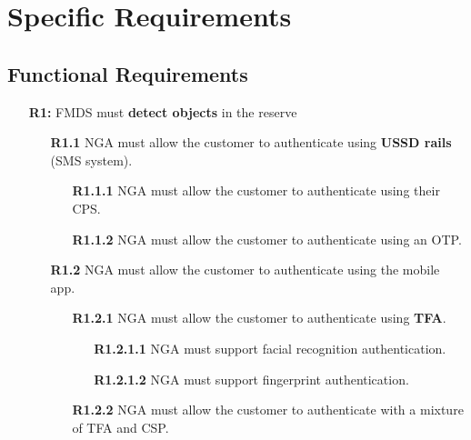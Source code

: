 \chapter{Specific Requirements}

\section{Functional Requirements}

\begin{itemize}
    \item  [\textbf{R1:}] FMDS must \textbf{detect objects} in the reserve
    
    \begin{itemize}
            \item  [\textbf{R1.1}] NGA must allow the customer to authenticate using \textbf{USSD rails} (SMS system).
                \begin{itemize}
                        \item  [\textbf{R1.1.1}] NGA must allow the customer to authenticate using their CPS.
                        \item  [\textbf{R1.1.2}] NGA must allow the customer to authenticate using an OTP.   
                \end{itemize}
            \item  [\textbf{R1.2}] NGA must allow the customer to authenticate using the mobile app.
        \begin{itemize}
            \item  [\textbf{R1.2.1}] NGA must allow the customer to authenticate using \textbf{TFA}.
                \begin{itemize}
                    \item  [\textbf{R1.2.1.1}] NGA must support facial recognition authentication.
                    \item  [\textbf{R1.2.1.2}] NGA must support fingerprint authentication.
                \end{itemize}
            \item  [\textbf{R1.2.2}] NGA must allow the customer to authenticate with a mixture of TFA and CSP.    
        \end{itemize}
    \end{itemize}
\end{itemize}
